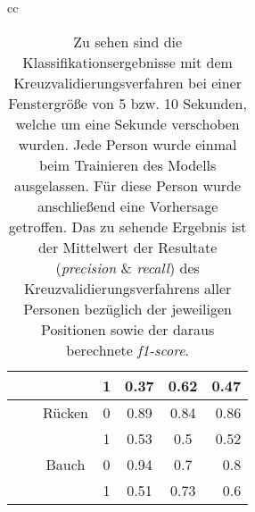 \begin{table}
\begin{tabular}{cc}
\begin{minipage}{1\linewidth}
\begin{center}
\begin{tabular}{ | l | c | c | c | c | c | r | }
                    &     &       & 1 & 0.37 & 0.62 & 0.47 \\ \hline
                    &     & Rücken& 0 & 0.89 & 0.84 & 0.86 \\
                    &     &       & 1 & 0.53 & 0.5  & 0.52 \\ \hline
                    &     & Bauch & 0 & 0.94 & 0.7  & 0.8  \\
                    &     &       & 1 & 0.51 & 0.73 & 0.6  \\ \hline
          \end{tabular}
          \smallskip
      \end{center}
  \end{minipage}     
  \end{tabular}
  \caption{Zu sehen sind die Klassifikationsergebnisse mit dem Kreuzvalidierungsverfahren bei einer Fenstergröße von 5 bzw. 10 Sekunden, welche um eine Sekunde verschoben wurden. Jede Person wurde einmal beim Trainieren des Modells ausgelassen. Für diese Person wurde anschließend eine Vorhersage getroffen. Das zu sehende Ergebnis ist der Mittelwert der Resultate (\textit{precision} \& \textit{recall}) des Kreuzvalidierungsverfahrens aller Personen bezüglich der jeweiligen Positionen sowie der daraus berechnete \textit{f1-score}.}
  \label{evaluation:loso_classification_results}  
\end{table}

\newpage

